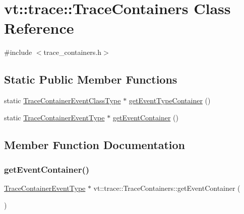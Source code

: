 \hypertarget{classvt_1_1trace_1_1_trace_containers}{}\section{vt\+:\+:trace\+:\+:Trace\+Containers Class Reference}
\label{classvt_1_1trace_1_1_trace_containers}


{\ttfamily \#include $<$trace\+\_\+containers.\+h$>$}

\subsection*{Static Public Member Functions}
\begin{DoxyCompactItemize}
\item 
static \hyperlink{namespacevt_1_1trace_a352c8799ee88afa3f1b7008952ed8485}{Trace\+Container\+Event\+Class\+Type} $\ast$ \hyperlink{classvt_1_1trace_1_1_trace_containers_aa7c9e38e33ed891e369d1ac959ce17fb}{get\+Event\+Type\+Container} ()
\item 
static \hyperlink{namespacevt_1_1trace_a80118aaa48fed940af3899800bba2303}{Trace\+Container\+Event\+Type} $\ast$ \hyperlink{classvt_1_1trace_1_1_trace_containers_a79da4019a13751017f10d80653333147}{get\+Event\+Container} ()
\end{DoxyCompactItemize}


\subsection{Member Function Documentation}
\mbox{\label{classvt_1_1trace_1_1_trace_containers_a79da4019a13751017f10d80653333147}} 
\subsubsection{\texorpdfstring{get\+Event\+Container()}{getEventContainer()}}
{\footnotesize\ttfamily \hyperlink{namespacevt_1_1trace_a80118aaa48fed940af3899800bba2303}{Trace\+Container\+Event\+Type} $\ast$ vt\+::trace\+::\+Trace\+Containers\+::get\+Event\+Container (\begin{DoxyParamCaption}{ }\end{DoxyParamCaption})\hspace{0.3cm}{\ttfamily [static]}}

